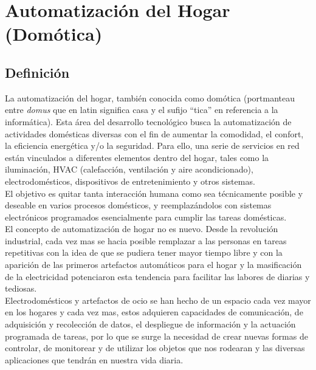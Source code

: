 
\section{Automatización del Hogar (Domótica)}

\subsection{Definición}
La automatización del hogar, también conocida como domótica (portmanteau entre \textit{domus} que en latin significa casa y el sufijo ``tica'' en referencia a la  informática). Esta área del desarrollo tecnológico busca la automatización de actividades domésticas diversas con el fin de aumentar la comodidad, el confort, la eficiencia energética y/o la seguridad. Para ello, una serie de servicios en red están vinculados a diferentes elementos dentro del hogar, tales como la iluminación, HVAC (calefacción, ventilación y aire acondicionado), electrodomésticos, dispositivos de entretenimiento y otros sistemas.\cite{atosDomotics}\\ 

El objetivo es quitar tanta interacción humana como sea técnicamente posible y deseable en varios procesos domésticos, y reemplazándolos con sistemas electrónicos programados esencialmente para cumplir las tareas domésticas.\\

El concepto de automatización de hogar no es nuevo. Desde la revolución industrial, cada vez mas se hacia posible remplazar a las personas en tareas repetitivas con la idea de que se pudiera tener mayor tiempo libre y con la aparición de las primeros artefactos automáticos para el hogar y la masificación de la electricidad potenciaron esta tendencia para facilitar las labores de diarias y tediosas.\\

Electrodomésticos y artefactos de ocio se han hecho de un espacio cada vez mayor en los hogares y cada vez mas, estos adquieren capacidades de comunicación, de adquisición y recolección de datos, el despliegue de información y la actuación programada de tareas, por lo que se surge la necesidad de crear nuevas formas de controlar, de monitorear y de utilizar los objetos que nos rodearan y las diversas aplicaciones que tendrán en nuestra vida diaria.\\

